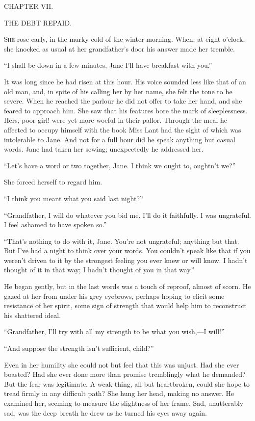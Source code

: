 {}

{CHAPTER VII.}

THE DEBT REPAID.

\textsc{She} rose early, in the murky cold of the winter morning. When,
at eight o'clock, she knocked as usual at her grandfather's door his
answer made her tremble.

``I shall be down in a few minutes, Jane I'll have breakfast with you.''

It was long since he had risen at this hour. His voice sounded less like
that of an old man, and, in spite of his calling her by her name, she
felt the tone to be severe. When he reached the parlour he did not offer
to take her hand, and she feared to approach him. She saw that his
features bore the mark of sleeplessness. Hers, poor girl! were yet more
woeful in their pallor. Through the meal he affected to occupy himself
with the book Miss Lant had {}the sight of which was intolerable to
Jane. And not for a full hour did he speak anything but casual words.
Jane had taken her sewing; unexpectedly he addressed her.

``Let's have a word or two together, Jane. I think we ought to, oughtn't
we?''

She forced herself to regard him.

``I think you meant what you said last night?''

``Grandfather, I will do whatever you bid me. I'll do it faithfully. I
was ungrateful. I feel ashamed to have spoken so.''

``That's nothing to do with it, Jane. You're not ungrateful; anything
but that. But I've had a night to think over your words. You couldn't
speak like that if you weren't driven to it by the strongest feeling you
ever knew or will know. I hadn't thought of it in that way; I hadn't
thought of you in that way.''

He began gently, but in the last words was a touch of reproof, almost of
scorn. He gazed at her from under his grey eyebrows, perhaps hoping to
elicit some resistance of her spirit, some sign of strength that would
help him to reconstruct his shattered ideal.

{}``Grandfather, I'll try with all my strength to be what you wish,---I
will!''

``And suppose the strength isn't sufficient, child?''

Even in her humility she could not but feel that this was unjust. Had
she ever boasted? Had she ever done more than promise tremblingly what
he demanded? But the fear was legitimate. A weak thing, all but
heartbroken, could she hope to tread firmly in any difficult path? She
hung her head, making no answer. He examined her, seeming to measure the
slightness of her frame. Sad, unutterably sad, was the deep breath he
drew as he turned his eyes away again.


